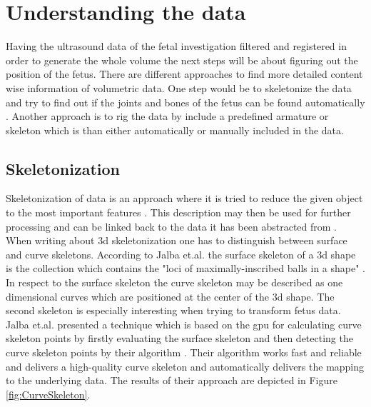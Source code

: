\section{Understanding the data}
Having the ultrasound data of the fetal investigation filtered and registered in order to generate the whole volume the next steps will be about figuring out the position of the fetus. There are different approaches to find more detailed content wise information of volumetric data. One step would be to skeletonize the data and try to find out if the joints and bones of the fetus can be found automatically \cite{Singh2004,Jin2017,Jalba2013}. Another approach is to rig the data by include a predefined armature or skeleton which is than either automatically \cite{Baran2007,Baran} or manually \cite{Finet2014Bender:Morphing} included in the data. 

\subsection{Skeletonization}

Skeletonization of data is an approach where it is tried to reduce the given object to the most important features \cite{Singh2004}. This description may then be used for further processing and can be linked back to the data it has been abstracted from \cite{Jalba2013}. When writing about \gls{3d} skeletonization one has to distinguish between surface and curve skeletons. According to Jalba et.al. the surface skeleton of a \gls{3d} shape is the collection which contains the "loci of maximally-inscribed balls in a shape" \cite{Jalba2013, Pizer2003MultiscaleProperties}. In respect to the surface skeleton the curve skeleton may be described as one dimensional curves which are positioned at the center of the \gls{3d} shape. The second skeleton is especially interesting when trying to transform fetus data. Jalba et.al. presented a technique which is based on the \gls{gpu} for calculating curve skeleton points by firstly evaluating the surface skeleton and then detecting the curve skeleton points by their algorithm \cite{Jalba2013}. Their algorithm works fast and reliable and delivers a high-quality curve skeleton and automatically delivers the mapping to the underlying data. The results of their approach are depicted in Figure \ref{fig:CurveSkeleton}.

